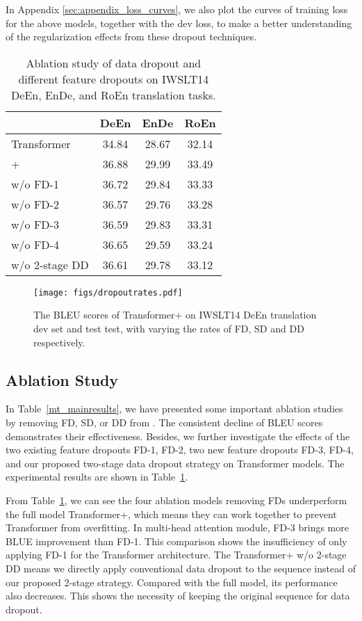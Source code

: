 \documentclass[11pt]{article}
\begin{document}
In Appendix \ref{sec:appendix_loss_curves}, we also plot the curves of training loss for the above models, together with the dev loss, to make a better understanding of the regularization effects from these dropout techniques.

\begin{table}[!tbp]
    \small
    \centering
{
		\centering
		\begin{tabular}{l| c c c}
		    \hline
		     & DeEn & EnDe & RoEn \\
			\hline
			Transformer & 34.84 & 28.67 & 32.14\\ 
			+ & 36.88 & 29.99 & 33.49\\
			\hline
			w/o FD-1 & 36.72 & 29.84 & 33.33\\
			w/o FD-2 & 36.57 & 29.76 & 33.28\\
			w/o FD-3 & 36.59 & 29.83 & 33.31\\
			w/o FD-4 & 36.65 & 29.59 & 33.24\\
			\hline
			w/o 2-stage DD & 36.61& 29.78 & 33.12\\
			\hline
           
	\end{tabular} }
    \caption{Ablation study of data dropout and different feature dropouts on IWSLT14 DeEn, EnDe, and RoEn translation tasks.} 
	\label{mt_ablation}
\end{table}


\begin{figure*}[!tbp]
\centering
\texttt{[image: figs/dropoutrates.pdf]}
\caption{The BLEU scores of Transformer+ on IWSLT14 DeEn translation dev set and test test, with varying the rates of FD, SD and DD respectively.}
\label{fig:varyingfd}
\end{figure*}



\subsection{Ablation Study}
In Table~\ref{mt_mainresults}, we have presented some important ablation studies by removing FD, SD, or DD from . The consistent decline of BLEU scores demonstrates their effectiveness. Besides, we further investigate the effects of the two existing feature dropouts FD-1, FD-2, two new feature dropouts FD-3, FD-4, and our proposed two-stage data dropout strategy on Transformer models. The experimental results are shown in Table~\ref{mt_ablation}.

From Table~\ref{mt_ablation}, we can see the four ablation models removing FDs underperform the full model Transformer+, which means they can work together to prevent Transformer from overfitting. In multi-head attention module, FD-3 brings more BLUE improvement than FD-1. This comparison shows the insufficiency of only applying FD-1 for the Transformer architecture. The Transformer+ w/o 2-stage DD means we directly apply conventional data dropout to the sequence instead of our proposed 2-stage strategy. Compared with the full model, its performance also decreases. This shows the necessity of keeping the original sequence for data dropout.  
\end{document}
